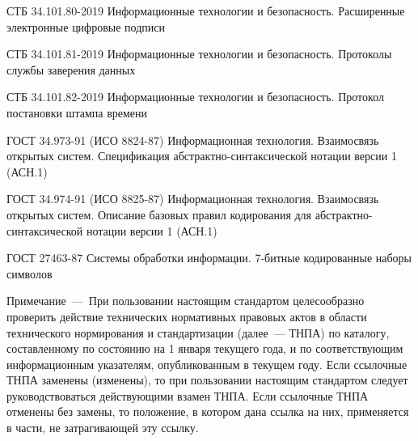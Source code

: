 СТБ 34.101.80-2019 
Информационные технологии и безопасность. 
Расширенные электронные цифровые подписи

СТБ 34.101.81-2019 
Информационные технологии и безопасность. 
Протоколы службы заверения данных

СТБ 34.101.82-2019 
Информационные технологии и безопасность. 
Протокол постановки штампа времени

ГОСТ 34.973-91 (ИСО 8824-87) Информационная технология. Взаимосвязь 
открытых систем. Спецификация абстрактно-синтаксической нотации версии 1 
(АСН.1) 

ГОСТ 34.974-91 (ИСО 8825-87) Информационная технология. Взаимосвязь 
открытых систем. Описание базовых правил кодирования для 
абстрактно-синтаксической нотации версии 1 (АСН.1) 

ГОСТ 27463-87 Системы обработки информации. 
7-битные кодированные наборы символов

\begin{note}
Примечание~---~При пользовании настоящим стандартом
целесообразно проверить действие технических нормативных правовых
актов в области технического нормирования и стандартизации (далее~--- ТНПА) 
по каталогу, составленному по состоянию на 1 января текущего
года, и по соответствующим информационным указателям, опубликованным
в текущем году. Если ссылочные ТНПА заменены (изменены), то при
пользовании настоящим стандартом следует руководствоваться
действующими взамен ТНПА. Если ссылочные ТНПА отменены без
замены, то положение, в котором дана ссылка на них, применяется в
части, не затрагивающей эту ссылку.
\end{note}
